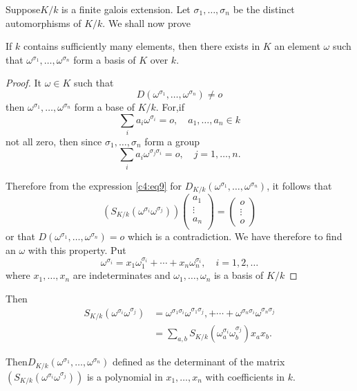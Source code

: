 Suppose\pageoriginale $K/k$ is a finite galois extension. Let
$\sigma_1, \ldots , \sigma_n$ be the distinct automorphisms of
$K/k$. We shall now prove   

\begin{thm}\label{c4:thm6}%
If $k$ contains sufficiently many elements, then there exists in
  $K$ an element $\omega$ such that $\omega^{\sigma_1}, \ldots ,
  \omega^{\sigma_n}$ form a basis of $K$ over $k$. 
\end{thm}

\begin{proof}
It $\omega \in K$ such that 
$$
D(\omega^{\sigma_1}, \ldots , \omega^{\sigma_n}) \neq o 
$$
then $\omega^{\sigma_1}, \ldots , \omega^{\sigma_n}$ form a base of
$K/k$. For,if  
$$
\sum_i a_i \omega^{\sigma_i} = o, \quad  a_1, \ldots, a_n \in k
$$
not all zero, then since $\sigma_1, \ldots, \sigma_n$ form a group 
$$
\sum_{i}a_i \omega^{\sigma_j \sigma_i} = o, \quad j=1, \ldots,n. 
$$

Therefore from the expression \eqref{c4:eq9} for $D_{K/k}(\omega^{\sigma_1},
\ldots , \omega^{\sigma_n})$, it follows that  
$$
\left(S_{K/k}(\omega^{\sigma_i}\omega^{\sigma_j})  \right)
\begin{pmatrix}
a_1\\ \vdots \\ a_n \\ 
\end{pmatrix}
=
\begin{pmatrix}
o\\
 \vdots \\ 
 o
\end{pmatrix}
$$
or that $D(\omega^{\sigma_ 1},\ldots,\omega^{\sigma_n})=o$ which is a
contradiction. We have therefore to find an $\omega$ with this
property. Put  
$$
\omega^{\sigma_i}= x_1\omega^{\sigma_i}_1+ \cdots + x_n
\omega^{\sigma_i}_n, \quad i= 1,2, \ldots  
$$
where $x_1, \ldots ,x_n$ are indeterminates and $\omega_1, \ldots ,
\omega_n$ is a basis of $K/k$ 
\end{proof}

Then 
\begin{align*}
S_{K/k}(\omega^{\sigma_i}\omega^{\sigma_j}) &= \omega^{\sigma_1
  \sigma_i}\omega^{\sigma_1\sigma_j}, + \cdots + \omega^{\sigma_n
  \sigma_i}\omega^{\sigma_n \sigma_j}\\ 
&= \sum_{a,b} S_{K/k}(\omega^{\sigma_i}_a \omega^{\sigma_j}_b) x_a
x_b. 
\end{align*}

Then\pageoriginale $D_{K/k}(\omega^{\sigma_1}, \ldots,
\omega^{\sigma_n})$ defined as the determinant of the matrix
$(S_{K/k}(\omega^{\sigma_i} \omega^{\sigma_j}))$ is a polynomial in
$x_1, \ldots, x_n$ with coefficients in $k$.  

